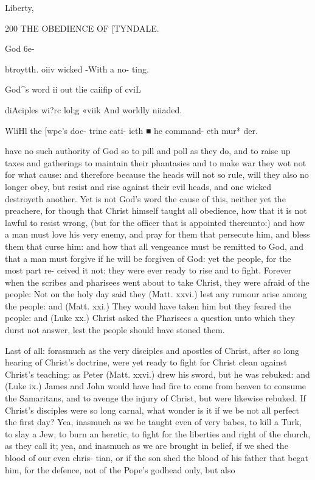\documentclass{custom}
\begin{document}
Liberty, 


200
THE OBEDIENCE OF
[TYNDALE.

God 6e- 

btroytth. 
oiiv wicked 
-With a no- 
ting. 

God^s word 
ii out tlie 
caiifip of 
cviL 

diAciples 
wi?rc lol;g 
«viik And 
worldly 
niiaded. 

WliHl the 
[wpe's doc- 
trine cati- 
icth ■ he 
command- 
eth mur* 
der. 

have no such authority of God so to pill and poll as they
do, and to raise up taxes and gatherings to maintain their 
phantasies and to make war they wot not for what cause:
and therefore because the heads will not so rule, will they 
also no longer obey, but resist and rise against their evil 
heads, and one wicked destroyeth another. Yet is not 
God's word the cause of this, neither yet the preachere, 
for though that Christ himself taught all obedience, how 
that it is not lawful to resist wrong, (but for the officer that 
is appointed thereunto:) and how a man must love his very 
enemy, and pray for them that persecute him, and bless 
them that curse him: and how that all vengeance must be 
remitted to God, and that a man must forgive if he will be 
forgiven of God: yet the people, for the most part re-
ceived it not: they were ever ready to rise and to fight.
Forever when the scribes and pharisees went about to take 
Christ, they were afraid of the people: Not on the holy 
day said they (Matt. xxvi.) lest any rumour arise among 
the people: and (Matt. xxi.) They would have taken him 
but they feared the people: and (Luke xx.) Christ asked 
the Pharisees a question unto which they durst not answer,
lest the people should have stoned them. 

Last of all: forasmuch as the very disciples and apostles 
of Christ, after so long hearing of Christ's doctrine, were 
yet ready to fight for Christ clean against Christ's teaching:
as Peter (Matt. xxvi.) drew his sword, but he was rebuked:
and (Luke ix.) James and John would have had fire to 
come from heaven to consume the Samaritans, and to 
avenge the injury of Christ, but were likewise rebuked. If 
Christ's disciples were so long carnal, what wonder is it if 
we be not all perfect the first day? Yea, inasmuch as we 
be taught even of very babes, to kill a Turk, to slay a Jew, 
to burn an heretic, to fight for the liberties and right of 
the church, as they call it; yea, and inasmuch as we are 
brought in belief, if we shed the blood of our even chris- 
tian, or if the son shed the blood of his father that begat him, 
for the defence, not of the Pope's godhead only, but also 
\end{document}
